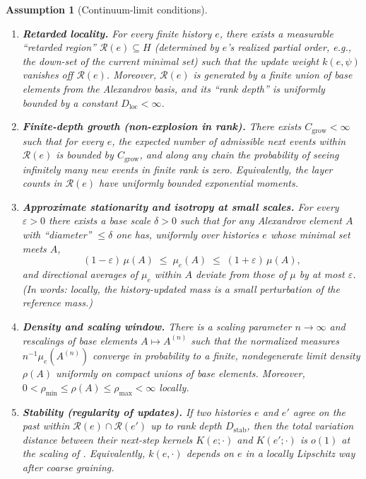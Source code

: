 \documentclass[12pt,a4paper]{article}
\newtheorem{assumption}{Assumption}
\begin{document}
\begin{assumption}[Continuum-limit conditions]\label{ass:CL}
\leavevmode
\begin{enumerate}
  \item[(CL1)]\label{cl:1}\textbf{Retarded locality.}
  For every finite history $e$, there exists a measurable ``retarded region'' $\mathcal R(e)\subseteq H$
  (determined by $e$'s realized partial order, e.g., the down-set of the current minimal set)
  such that the update weight $k(e,\psi)$ vanishes off $\mathcal R(e)$.
  Moreover, $\mathcal R(e)$ is generated by a finite union of base elements from the Alexandrov basis,
  and its ``rank depth'' is uniformly bounded by a constant $D_{\mathrm{loc}}<\infty$.

  \item[(CL2)]\label{cl:2}\textbf{Finite-depth growth (non-explosion in rank).}
  There exists $C_{\mathrm{grow}}<\infty$ such that for every $e$,
  the expected number of admissible next events within $\mathcal R(e)$ is bounded by $C_{\mathrm{grow}}$,
  and along any chain the probability of seeing infinitely many new events in finite rank is zero.
  Equivalently, the layer counts in $\mathcal R(e)$ have uniformly bounded exponential moments.

  \item[(CL3)]\label{cl:3}\textbf{Approximate stationarity and isotropy at small scales.}
  For every $\varepsilon>0$ there exists a base scale $\delta>0$ such that for any Alexandrov
  element $A$ with ``diameter'' $\le \delta$ one has, uniformly over histories $e$ whose minimal
  set meets $A$,
  \[
    (1-\varepsilon)\,\mu(A) \;\le\; \mu_e(A) \;\le\; (1+\varepsilon)\,\mu(A),
  \]
  and directional averages of $\mu_e$ within $A$ deviate from those of $\mu$ by at most $\varepsilon$.
  (In words: locally, the history-updated mass is a small perturbation of the reference mass.)

  \item[(CL4)]\label{cl:4}\textbf{Density and scaling window.}
  There is a scaling parameter $n\to\infty$ and rescalings of base elements $A\mapsto A^{(n)}$
  such that the normalized measures $n^{-1}\mu_e(A^{(n)})$ converge in probability to a finite,
  nondegenerate limit density $\rho(A)$ uniformly on compact unions of base elements.
  Moreover, $0<\rho_{\min}\le \rho(A)\le \rho_{\max}<\infty$ locally.

  \item[(CL5)]\label{cl:5}\textbf{Stability (regularity of updates).}
  If two histories $e$ and $e'$ agree on the past within $\mathcal R(e)\cap\mathcal R(e')$
  up to rank depth $D_{\mathrm{stab}}$, then the total variation distance between their next-step
  kernels $K(e;\cdot)$ and $K(e';\cdot)$ is $o(1)$ at the scaling of .
  Equivalently, $k(e,\cdot)$ depends on $e$ in a locally Lipschitz way after coarse graining.
\end{enumerate}
\end{assumption}
\end{document}
